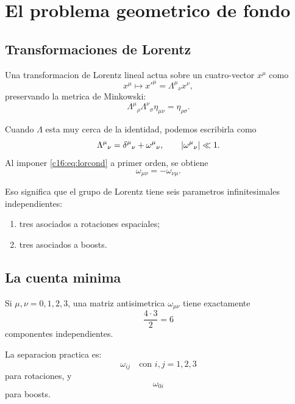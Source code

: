 \section{El problema geometrico de fondo}
\subsection{Transformaciones de Lorentz}
Una transformacion de Lorentz lineal actua sobre un cuatro-vector $x^\mu$ como
\begin{equation}
x^\mu \mapsto x'^\mu = \Lambda^\mu{}_\nu x^\nu,
\end{equation}
preservando la metrica de Minkowski:
\begin{equation}
\Lambda^\mu{}_\rho \Lambda^\nu{}_\sigma \eta_{\mu\nu} = \eta_{\rho\sigma}.
\label{c16:eq:lorcond}
\end{equation}

Cuando $\Lambda$ esta muy cerca de la identidad, podemos escribirla como
\begin{equation}
\Lambda^\mu{}_\nu = \delta^\mu{}_\nu + \omega^\mu{}_\nu,
\qquad
\abs{\omega^\mu{}_\nu}\ll 1.
\end{equation}
Al imponer \eqref{c16:eq:lorcond} a primer orden, se obtiene
\begin{equation}
\omega_{\mu\nu} = -\omega_{\nu\mu}.
\label{c16:eq:antisym}
\end{equation}

Eso significa que el grupo de Lorentz tiene seis parametros infinitesimales independientes:
\begin{enumerate}[label=\arabic*.]
    \item tres asociados a rotaciones espaciales;
    \item tres asociados a boosts.
\end{enumerate}

\subsection{La cuenta minima}
Si $\mu,\nu=0,1,2,3$, una matriz antisimetrica $\omega_{\mu\nu}$ tiene exactamente
\begin{equation}
\frac{4\cdot 3}{2}=6
\end{equation}
componentes independientes.

La separacion practica es:
\begin{equation}
\omega_{ij} \quad \text{con } i,j=1,2,3
\end{equation}
para rotaciones, y
\begin{equation}
\omega_{0i}
\end{equation}
para boosts.

